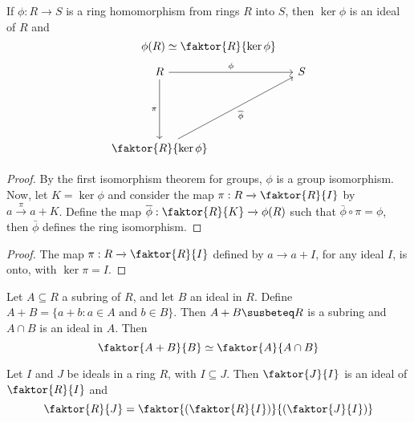 \begin{theorem}\label{1.3.4}
    If $\phi:R \xrightarrow{} S$ is a ring homomorphism from rings $R$ into $S$,
    then $\ker{\phi}$ is an ideal of $R$ and
    \begin{equation*}
        \phi(R) \simeq \faktor{R}{\ker{\phi}}
    \end{equation*}
    \[\begin{tikzcd}
        R &&& S \\
        \\
        \\
        {\faktor{R}{\ker{\phi}}}
        \arrow["\pi"', from=1-1, to=4-1]
        \arrow["\phi", from=1-1, to=1-4]
        \arrow["{\bar{\phi}}"', from=4-1, to=1-4]
    \end{tikzcd}\]
\end{theorem}
\begin{proof}
    By the first isomorphism theorem for groups, $\phi$ is a group isomorphism.
    Now, let $K=\ker{\phi}$ and consider the map $\pi:R \xrightarrow{}
    \faktor{R}{I}$ by $a \xrightarrow{\pi} a+K$. Define the map
    $\bar{\phi}:\faktor{R}{K} \xrightarrow{} \phi(R)$ such that $\bar{\phi}
    \circ \pi=\phi$, then $\bar{\phi}$ defines the ring isomorphism.
\end{proof}
\begin{proof}
    The map $\pi:R \xrightarrow{} \faktor{R}{I}$ defined by $a \xrightarrow{}
    a+I$, for any ideal $I$, is onto, with  $\ker{\pi}=I$.
\end{proof}

\begin{theorem}\label{1.3.5}
    Let $A \subseteq R$ a subring of  $R$, and let  $B$ an ideal in  $R$. Define
     $A+B=\{a+b : a \in A \text{ and } b \in B\}$. Then $A+B \susbeteq R$ is a
     subring and  $A \cap B$ is an ideal in $A$. Then
     \begin{equation*}
         \faktor{A+B}{B} \simeq \faktor{A}{A \cap B}
     \end{equation*}
\end{theorem}

\begin{theorem}\label{1.3.6}
    Let $I$ and  $J$ be ideals in a ring  $R$, with  $I \subseteq J$. Then
    $\faktor{J}{I}$ is an ideal of $\faktor{R}{I}$ and
    \begin{equation*}
        \faktor{R}{J}=\faktor{(\faktor{R}{I})}{(\faktor{J}{I})}
    \end{equation*}
\end{theorem}

